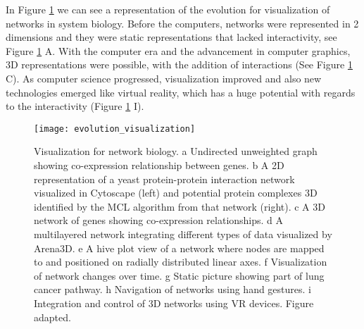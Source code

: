 In Figure \ref{fig:network_biology_evolution} we can see a representation of the evolution for visualization of networks in system biology. Before the computers, networks were represented in 2 dimensions and they were static representations that lacked interactivity, see Figure \ref{fig:network_biology_evolution} A. With the computer era and the advancement in computer graphics, 3D representations were possible, with the addition of interactions (See Figure  \ref{fig:network_biology_evolution} C). As computer science progressed, visualization improved and also new technologies emerged like virtual reality, which has a huge potential with regards to the interactivity (Figure \ref{fig:network_biology_evolution} I).

\begin{figure}[h!]
    \newlength{\tempheight}
    \setlength{\tempheight}{15ex}
    \centering%
    \texttt{[image: evolution\_visualization]}
    \caption{Visualization for network biology. a Undirected unweighted graph showing co-expression relationship between genes. b A 2D representation of a yeast protein-protein interaction network visualized in Cytoscape (left) and potential protein complexes 3D identified by the MCL algorithm from that network (right). c A 3D network of genes showing co-expression relationships. d A multilayered network integrating different types of data visualized by Arena3D. e A hive plot view of a network where nodes are mapped to and positioned on radially distributed linear axes. f Visualization of network changes over time. g Static picture showing part of lung cancer pathway. h Navigation of networks using hand gestures. i Integration and control of 3D networks using VR devices. Figure adapted\cite{pavlopoulos_malliarakis_papanikolaou_theodosiou_enright_iliopoulos_2015}.}
    \label{fig:network_biology_evolution}
\end{figure}
